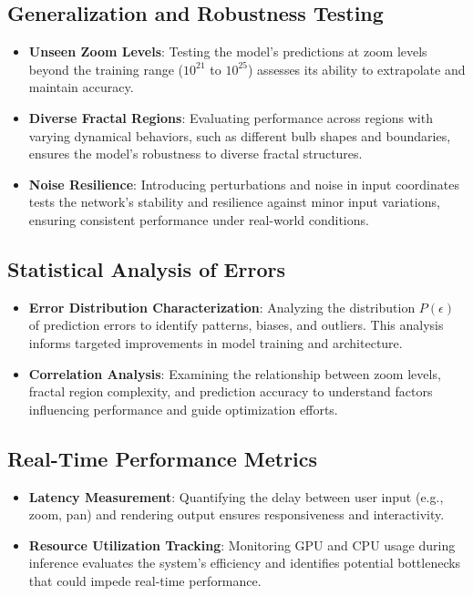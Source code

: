 \documentclass[journal]{IEEEaccess}
\begin{document}
\subsection{Generalization and Robustness Testing}
\begin{itemize}
    \item \textbf{Unseen Zoom Levels}: Testing the model's predictions at zoom levels beyond the training range (\(10^{21}\) to \(10^{25}\)) assesses its ability to extrapolate and maintain accuracy.
    
    \item \textbf{Diverse Fractal Regions}: Evaluating performance across regions with varying dynamical behaviors, such as different bulb shapes and boundaries, ensures the model's robustness to diverse fractal structures.
    
    \item \textbf{Noise Resilience}: Introducing perturbations and noise in input coordinates tests the network's stability and resilience against minor input variations, ensuring consistent performance under real-world conditions.
\end{itemize}

\subsection{Statistical Analysis of Errors}
\begin{itemize}
    \item \textbf{Error Distribution Characterization}: Analyzing the distribution \( P(\epsilon) \) of prediction errors to identify patterns, biases, and outliers. This analysis informs targeted improvements in model training and architecture.
    
    \item \textbf{Correlation Analysis}: Examining the relationship between zoom levels, fractal region complexity, and prediction accuracy to understand factors influencing performance and guide optimization efforts.
\end{itemize}

\subsection{Real-Time Performance Metrics}
\begin{itemize}
    \item \textbf{Latency Measurement}: Quantifying the delay between user input (e.g., zoom, pan) and rendering output ensures responsiveness and interactivity.
    
    \item \textbf{Resource Utilization Tracking}: Monitoring GPU and CPU usage during inference evaluates the system's efficiency and identifies potential bottlenecks that could impede real-time performance.
\end{itemize}
\end{document}
